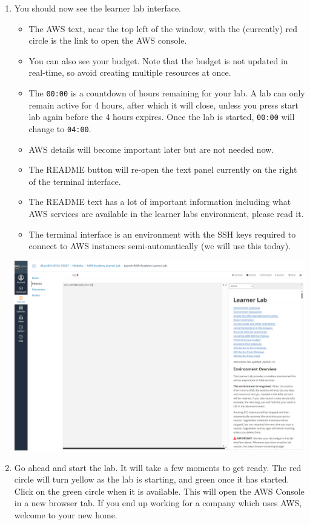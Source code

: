 \documentclass{csse4400}
\begin{document}
\begin{enumerate}
\item You should now see the learner lab interface.
\begin{itemize}
      \item The AWS text, near the top left of the window, with the (currently) red circle is the link to open the AWS console.
      \item You can also see your budget. Note that the budget is not updated in real-time, so avoid creating multiple resources at once.
      \item The \texttt{00:00} is a countdown of hours remaining for your lab.
      A lab can only remain active for 4 hours, after which it will close, unless you press start lab again before the 4 hours expires.
      Once the lab is started, \texttt{00:00} will change to \texttt{04:00}.
      \item AWS details will become important later but are not needed now.
      \item The README button will re-open the text panel currently on the right of the terminal interface.
      \item The README text has a lot of important information including what AWS services are available in the learner labs environment, please read it.
      \item The terminal interface is an environment with the SSH keys required to connect to AWS instances semi-automatically (we will use this today).
\end{itemize}

\hspace{-6mm}
\includegraphics[width=\textwidth]{images/lab-interface}

\item Go ahead and start the lab. It will take a few moments to get ready.
      The red circle will turn yellow as the lab is starting, and green once it has started.
      Click on the green circle when it is available.
      This will open the AWS Console in a new browser tab.
      If you end up working for a company which uses AWS, welcome to your new home.


\end{enumerate}
\end{document}
